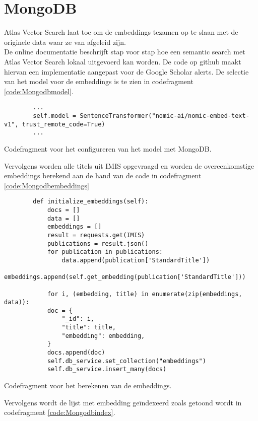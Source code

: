 \section{MongoDB}
Atlas Vector Search \autocite{Mongodbvectorsearch2025} laat toe om de embeddings tezamen op te slaan met de originele data waar ze van afgeleid zijn.\\
De online documentatie \textcite{Usemongodbvectorsearch2025} beschrijft stap voor stap hoe een semantic search met Atlas Vector Search lokaal uitgevoerd kan worden. 
De code op github \textcite{Depaepemongodb2025} maakt hiervan een implementatie aangepast voor de Google Scholar alerts.
De selectie van het model voor de embeddings is te zien in codefragment \ref{code:Mongodbmodel}.
\begin{listing}
    \begin{verbatim}
        ...
        self.model = SentenceTransformer("nomic-ai/nomic-embed-text-v1", trust_remote_code=True)
        ...
    \end{verbatim}
    \caption[MongoDB model codefragment]{Codefragment voor het configureren van het model met MongoDB.}
    \label{code:Mongodbmodel}
\end{listing}
Vervolgens worden alle titels uit IMIS opgevraagd en worden de overeenkomstige embeddings berekend aan de hand van de code in codefragment \ref{code:Mongodbembeddings}
\begin{listing}
    \begin{verbatim}
        def initialize_embeddings(self):
            docs = []
            data = []
            embeddings = []
            result = requests.get(IMIS)
            publications = result.json()
            for publication in publications:
                data.append(publication['StandardTitle'])
                embeddings.append(self.get_embedding(publication['StandardTitle']))
        
            for i, (embedding, title) in enumerate(zip(embeddings, data)):
            doc = {
                "_id": i,
                "title": title,
                "embedding": embedding,
            }
            docs.append(doc)
            self.db_service.set_collection("embeddings")
            self.db_service.insert_many(docs)
    \end{verbatim}
    \caption[Embeddings codefragment]{Codefragment voor het berekenen van de embeddings.}
    \label{code:Mongodbembeddings}
\end{listing}
Vervolgens wordt de lijst met embedding geïndexeerd zoals getoond wordt in codefragment \ref{code:Mongodbindex}.

